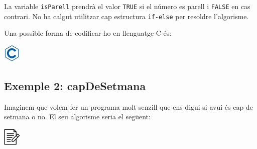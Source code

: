 \documentclass[]{book}
\newenvironment{Shaded}{\begin{snugshade}}{\end{snugshade}}
\newcommand{\KeywordTok}[1]{\textcolor[rgb]{0.13,0.29,0.53}{\textbf{#1}}}
\newcommand{\DataTypeTok}[1]{\textcolor[rgb]{0.13,0.29,0.53}{#1}}
\newcommand{\DecValTok}[1]{\textcolor[rgb]{0.00,0.00,0.81}{#1}}
\newcommand{\SpecialCharTok}[1]{\textcolor[rgb]{0.00,0.00,0.00}{#1}}
\newcommand{\StringTok}[1]{\textcolor[rgb]{0.31,0.60,0.02}{#1}}
\newcommand{\ImportTok}[1]{#1}
\newcommand{\ControlFlowTok}[1]{\textcolor[rgb]{0.13,0.29,0.53}{\textbf{#1}}}
\newcommand{\PreprocessorTok}[1]{\textcolor[rgb]{0.56,0.35,0.01}{\textit{#1}}}
\newcommand{\NormalTok}[1]{#1}
\begin{document}
La variable \texttt{isParell} prendrà el valor \texttt{TRUE} si el
número es parell i \texttt{FALSE} en cas contrari. No ha calgut
utilitzar cap estructura \texttt{if-else} per resoldre l'algorisme.

Una possible forma de codificar-ho en llenguatge C és:

\includegraphics{./img/c.png}

\begin{Shaded}
\end{Shaded}

\subsection{Exemple 2: capDeSetmana}\label{exemple-2-capdesetmana}

Imaginem que volem fer un programa molt senzill que ens digui si avui és
cap de setmana o no. El seu algorisme seria el següent:

\includegraphics{./img/alg.png}
\end{document}
